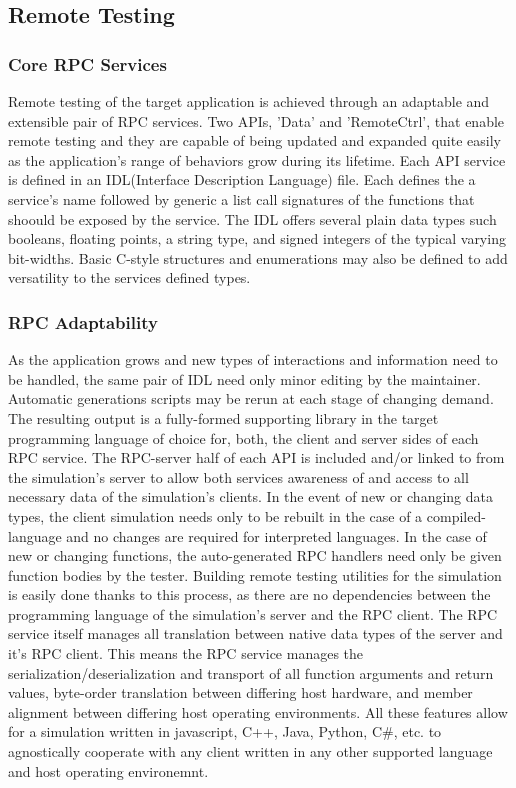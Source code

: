 \documentclass[conference]{IEEEtran}
\begin{document}
\subsection{Remote Testing}

\subsubsection{Core RPC Services}Remote testing of the target application is achieved through an adaptable and extensible pair of RPC services. Two APIs, 'Data' and 'RemoteCtrl', that enable remote testing and they are capable of being updated and expanded quite easily as the application's range of behaviors grow during its lifetime. Each API service is defined in an IDL(Interface Description Language) file. Each defines the a service's name followed by generic a list call signatures of the functions that shoould be exposed by the service. The IDL offers several plain data types such booleans, floating points, a string type, and signed integers of the typical varying bit-widths. Basic C-style structures and enumerations may also be defined to add versatility to the services defined types.
\subsubsection{RPC Adaptability}As the application grows and new types of interactions and information need to be handled, the same pair of IDL need only minor editing by the maintainer. Automatic generations scripts may be rerun at each stage of changing demand. The resulting output is a fully-formed supporting library in the target programming language of choice for, both, the client and server sides of each RPC service. The RPC-server half of each API is included and/or linked to from the simulation's server to allow both services awareness of and access to all necessary data of the simulation's clients. In the event of new or changing data types, the client simulation needs only to be rebuilt in the case of a compiled-language and no changes are required for interpreted languages. In the case of new or changing functions, the auto-generated RPC handlers need only be given function bodies by the tester. Building remote testing utilities for the simulation is easily done thanks to this process, as there are no dependencies between the programming language of the simulation's server and the RPC client. The RPC service itself manages all translation between native data types of the server and it's RPC client. This means the RPC service manages the serialization/deserialization and transport of all function arguments and return values, byte-order translation between differing host hardware, and member alignment between differing host operating environments. All these features allow for a simulation written in javascript, C++, Java, Python, C\#, etc. to agnostically cooperate with any client written in any other supported language and host operating environemnt.
\end{document}
